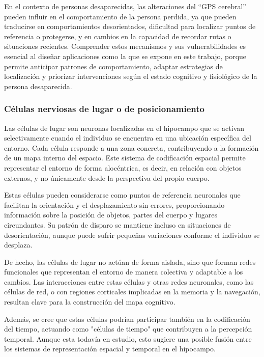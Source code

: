     En el contexto de personas desaparecidas, las alteraciones del ``GPS cerebral'' pueden influir en el comportamiento de la persona perdida, ya que pueden traducirse en comportamientos desorientados, dificultad para localizar puntos de referencia o protegerse, y en cambios en la capacidad de recordar rutas o situaciones recientes. Comprender estos mecanismos y sus vulnerabilidades es esencial al diseñar aplicaciones como la que se expone en este trabajo, porque permite anticipar patrones de comportamiento, adaptar estrategias de localización y priorizar intervenciones según el estado cognitivo y fisiológico de la persona desaparecida. \cite{ManualDeBusquedayRescate}

    
    \subsubsection{Células nerviosas de lugar o de posicionamiento}
    
    Las células de lugar son neuronas localizadas en el hipocampo que se activan selectivamente cuando el individuo se encuentra en una ubicación específica del entorno. Cada célula responde a una zona concreta, contribuyendo a la formación de un mapa interno del espacio. Este sistema de codificación espacial permite representar el entorno de forma alocéntrica, es decir, en relación con objetos externos, y no únicamente desde la perspectiva del propio cuerpo. \cite{MapaCognitivo_O_KEEFE,GPS_Cerebral_O_KEEFE, TiposCelulas_GPSCerebral, ManualDeBusquedayRescate}

    Estas células pueden considerarse como puntos de referencia neuronales que facilitan la orientación y el desplazamiento sin errores, proporcionando información sobre la posición de objetos, partes del cuerpo y lugares circundantes. Su patrón de disparo se mantiene incluso en situaciones de desorientación, aunque puede sufrir pequeñas variaciones conforme el individuo se desplaza.

    De hecho, las células de lugar no actúan de forma aislada, sino que forman redes funcionales que representan el entorno de manera colectiva y adaptable a los cambios. Las interacciones entre estas células y otras redes neuronales, como las células de red, o con regiones corticales implicadas en la memoria y la navegación, resultan clave para la construcción del mapa cognitivo.

    Además, se cree que estas células podrían participar también en la codificación del tiempo, actuando como "células de tiempo" que contribuyen a la percepción temporal. Aunque esta todavía en estudio, esto sugiere una posible fusión entre los sistemas de representación espacial y temporal en el hipocampo.


